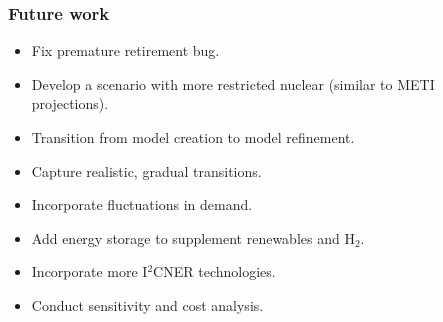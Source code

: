 \begin{frame}
  \frametitle{Future work}
   \begin{itemize}
   
   \item Fix premature retirement bug.
   
   \item Develop a scenario with more restricted nuclear (similar to METI projections).
   
   \item Transition from model creation to model refinement.
   
   \item Capture realistic, gradual transitions.
   
   \item Incorporate fluctuations in demand.
   
   \item Add energy storage to supplement renewables and H$_2$.
   
   \item Incorporate more I$^2$CNER technologies.
   
   \item Conduct sensitivity and cost analysis.
   
   \end{itemize}

\end{frame}